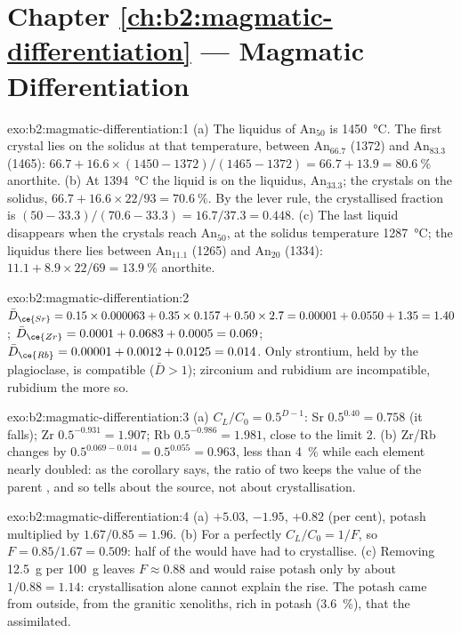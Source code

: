 \section*{Chapter \ref{ch:b2:magmatic-differentiation} --- Magmatic Differentiation}

\begin{solution}{exo:b2:magmatic-differentiation:1}
(a) The liquidus of An$_{50}$ is \qty{1450}{\celsius}. The first crystal lies on the
solidus at that temperature, between An$_{66.7}$ (1372) and An$_{83.3}$ (1465):
$66.7 + 16.6\times(1450 - 1372)/(1465 - 1372) = 66.7 + 13.9 = \qty{80.6}{\percent}$
anorthite. (b) At \qty{1394}{\celsius} the liquid is on the liquidus,
An$_{33.3}$; the crystals on the solidus, $66.7 + 16.6\times22/93 =
\qty{70.6}{\percent}$. By the lever rule, the crystallised fraction is $(50 -
33.3)/(70.6 - 33.3) = 16.7/37.3 = 0.448$. (c) The last liquid disappears when the
crystals reach An$_{50}$, at the solidus temperature \qty{1287}{\celsius}; the
liquidus there lies between An$_{11.1}$ (1265) and An$_{20}$ (1334): $11.1 +
8.9\times22/69 = \qty{13.9}{\percent}$ anorthite.
\end{solution}

\begin{solution}{exo:b2:magmatic-differentiation:2}
$\bar D_{\ce{Sr}} = 0.15\times0.000063 + 0.35\times0.157 + 0.50\times2.7 = 0.00001 +
0.0550 + 1.35 = 1.40$; $\bar D_{\ce{Zr}} = 0.0001 + 0.0683 + 0.0005 = 0.069$;
$\bar D_{\ce{Rb}} = 0.00001 + 0.0012 + 0.0125 = 0.014$. Only strontium, held by the
plagioclase, is compatible ($\bar D > 1$); zirconium and rubidium are incompatible,
rubidium the more so.
\end{solution}

\begin{solution}{exo:b2:magmatic-differentiation:3}
(a) $C_L/C_0 = 0.5^{D-1}$: Sr $0.5^{0.40} = 0.758$ (it falls); Zr $0.5^{-0.931} =
1.907$; Rb $0.5^{-0.986} = 1.981$, close to the limit 2. (b) Zr/Rb changes by
$0.5^{0.069 - 0.014} = 0.5^{0.055} = 0.963$, less than \qty{4}{\percent} while each
element nearly doubled: as the corollary says, the ratio of two  keeps the value of the parent , and so tells about the source, not
about crystallisation.
\end{solution}

\begin{solution}{exo:b2:magmatic-differentiation:4}
(a)  $+5.03$,  $-1.95$,  $+0.82$ (per cent), potash
multiplied by $1.67/0.85 = 1.96$. (b) For a perfectly 
$C_L/C_0 = 1/F$, so $F = 0.85/1.67 = 0.509$: half of the  would have had to
crystallise. (c) Removing \qty{12.5}{g} per \qty{100}{g} leaves $F \approx 0.88$ and
would raise potash only by about $1/0.88 = 1.14$: crystallisation alone cannot
explain the rise. The potash came from outside, from the granitic xenoliths, rich in
potash (\qty{3.6}{\percent}), that the  assimilated.
\end{solution}

